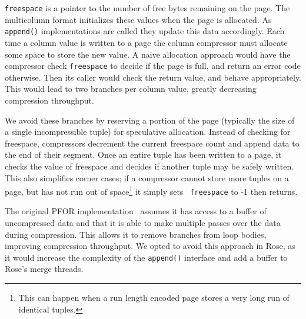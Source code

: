\documentclass{vldb}
\newcommand{\rows}{Rose\xspace}
\newcommand{\rowss}{Rose's\xspace}
\begin{document}
{\tt freespace} is a pointer to the number of free bytes
remaining on the page.  The multicolumn format initializes these
values when the page is allocated.  As {\tt append()} implementations
are called they update this data accordingly.  Each time a column
value is written to a page the column compressor must allocate some
space to store the new value.  A naive allocation approach would have
the compressor check {\tt freespace} to decide if the page is full,
and return an error code otherwise.  Then its caller would check the
return value, and behave appropriately.  This would lead to two branches
per column value, greatly decreasing compression throughput.

We avoid these branches by reserving a portion of the page (typically the
size of a single incompressible tuple) for speculative allocation.
Instead of checking for freespace, compressors decrement the current
freespace count and append data to the end of their segment.
Once an entire tuple has been written to a page,
it checks the value of freespace and decides if another tuple may be
safely written.  This also simplifies corner cases; if a
compressor cannot store more tuples on a page, but has not run out of
space\footnote{This can happen when a run length encoded page stores a
  very long run of identical tuples.} it simply sets {\tt
  freespace} to -1 then returns.



The original PFOR implementation~\cite{pfor} assumes it has access to
a buffer of uncompressed data and that it is able to make multiple
passes over the data during compression.  This allows it to remove
branches from loop bodies, improving compression throughput.  We opted
to avoid this approach in \rows, as it would increase the complexity
of the {\tt append()} interface and add a buffer to \rowss merge threads.

\end{document}
